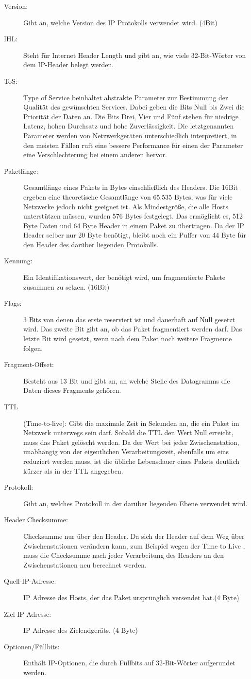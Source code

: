 \begin{description}
\item[Version: ]Gibt an, welche Version des IP Protokolls verwendet wird. (4Bit)
\item[IHL: ]Steht für Internet Header Length und gibt an, wie viele 32-Bit-Wörter von dem IP-Header belegt werden.
\item[ToS: ]Type of Service beinhaltet abstrakte Parameter zur Bestimmung der Qualität des gewünschten Services. Dabei geben die Bits Null bis Zwei die Priorität der Daten an. Die Bits Drei, Vier und Fünf stehen für niedrige Latenz, hohen Durchsatz und hohe Zuverlässigkeit. Die letztgenannten Parameter werden von Netzwerkgeräten unterschiedlich interpretiert, in den meisten Fällen ruft eine bessere Performance für einen der Parameter eine Verschlechterung bei einem anderen hervor.
\item[Paketlänge: ]Gesamtlänge eines Pakets in Bytes einschließlich des Headers. Die 16Bit ergeben eine theoretische Gesamtlänge von 65.535 Bytes, was für viele Netzwerke jedoch nicht geeignet ist. Als Mindestgröße, die alle Hosts unterstützen müssen, wurden 576 Bytes festgelegt. Das ermöglicht es, 512 Byte Daten und 64 Byte Header in einem Paket zu übertragen. Da der IP Header selber nur 20 Byte benötigt, bleibt noch ein Puffer von 44 Byte für den Header des darüber liegenden Protokolls.  
\item[Kennung: ]Ein Identifikationswert, der benötigt wird, um fragmentierte Pakete zusammen zu setzen.  (16Bit) 
\item[Flags: ]3 Bits von denen das erste reserviert ist und dauerhaft auf Null gesetzt wird. Das zweite Bit gibt an, ob das Paket fragmentiert werden darf. Das letzte Bit wird gesetzt, wenn nach dem Paket noch weitere Fragmente folgen.
\item[Fragment-Offset: ]Besteht aus 13 Bit und gibt an, an welche Stelle des Datagramms die Daten dieses Fragments gehören. 
\item[TTL ](Time-to-live): Gibt die maximale Zeit in Sekunden an, die ein Paket im Netzwerk unterwegs sein darf. Sobald die TTL den Wert Null erreicht, muss das Paket gelöscht werden. Da der Wert bei jeder Zwischenstation, unabhängig von der eigentlichen Verarbeitungszeit, ebenfalls um eins reduziert werden muss, ist die übliche Lebensdauer eines Pakets deutlich kürzer als in der TTL angegeben. 
\item[Protokoll: ]Gibt an, welches Protokoll in der darüber liegenden Ebene verwendet wird.
\item[Header Checksumme: ]Checksumme nur über den Header. Da sich der Header auf dem Weg über Zwischenstationen verändern kann, zum Beispiel wegen der Time to Live , muss die Checksumme nach jeder Verarbeitung des Headers an den Zwischenstationen neu berechnet werden.
\item[Quell-IP-Adresse: ]IP Adresse des Hosts, der das Paket ursprünglich versendet hat.(4 Byte)
\item[Ziel-IP-Adresse: ]IP Adresse des Zielendgeräts. (4 Byte)
\item[Optionen/Füllbits: ] Enthält IP-Optionen, die durch Füllbits auf 32-Bit-Wörter aufgerundet werden.
\end{description}
\cite{IPrfc}
